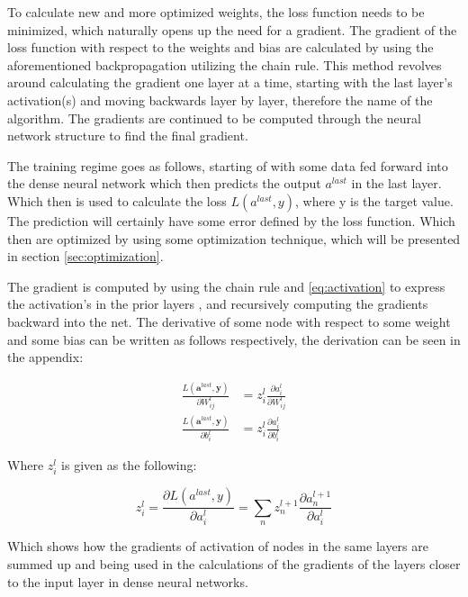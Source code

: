 \documentclass[../main.tex]{subfiles}
\begin{document}
To calculate new and more optimized weights, the loss function needs to be minimized, which naturally opens up the need for a gradient. The gradient of the loss function with respect to the weights and bias are calculated by using the aforementioned backpropagation utilizing the chain rule. This method revolves around calculating the gradient one layer at a time, starting with the last layer's activation(s) and moving backwards layer by layer, therefore the name of the algorithm. The gradients are continued to be computed through the neural network structure to find the final gradient.

The training regime goes as follows, starting of with some data fed forward into the dense neural network which then predicts the output \ensuremath{a^{last}} in the last layer. Which then is used to calculate the loss \ensuremath{L(a^{last},y)}, where y is the target value. The prediction will certainly have some error defined by the loss function. Which then are optimized by using some optimization technique, which will be presented in section \cref{sec:optimization}.

The gradient is computed by using the chain rule and \autoref{eq:activation} to express the activation's in the prior layers \cite[ch.~7]{rojasRa:nnsystematic} \cite{chain_rule}, and recursively computing the gradients backward into the net. The derivative of some node with respect to some weight and some bias can be written as follows respectively, the derivation can be seen in the appendix:

\begin{align*}
\frac{L\left(\boldsymbol{a}^{last}, \boldsymbol{y}\right)}{\partial W_{i j}^{l}}&=z_{i}^{l} \frac{\partial a_{i}^{l}}{\partial W_{i j}^{l}} \\
\frac{L\left(\boldsymbol{a}^{last}, \boldsymbol{y}\right)}{\partial b_{i}^{l}}&=z_{i}^{l} \frac{\partial a_{i}^{l}}{\partial b_{i}^{l}}
\end{align*}

Where \ensuremath{z_i^l} is given as the following:

\begin{equation*}
    z_i^l= \frac{\partial L(a^{last},y)}{\partial a_{i}^l}= \sum_n z_n^{l+1}\frac{\partial a_n^{l+1}}{\partial a_{i}^l}
\end{equation*}

Which shows how the gradients of activation of nodes in the same layers are summed up and being used in the calculations of the gradients of the layers closer to the input layer in dense neural networks.
\end{document}
